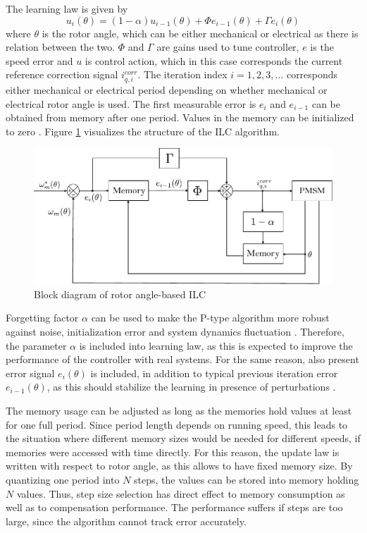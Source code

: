 The learning law is given by \cite{ILC:2005, ILC:2004}
\begin{equation}
    u_{i}(\theta) = (1 - \alpha)u_{i-1}(\theta) + \Phi e_{i-1}(\theta) + \Gamma e_{i}(\theta)
    \label{ILC_update_law2}
\end{equation}
where $\theta$ is the rotor angle, which can be either mechanical or electrical as there is relation between the two. $\Phi$ and $\Gamma$ are gains used to tune controller, $e$ is the speed error and $u$ is control action, which in this case corresponds the current reference correction signal $i^{corr}_{q,i}$. The iteration index $i = 1,2,3,...$ corresponds either mechanical or electrical period depending on whether mechanical or electrical rotor angle is used. The first measurable error is $e_i$ and $e_{i-1}$ can be obtained from memory after one period. Values in the memory can be initialized to zero \cite{ILC:2004}. Figure \ref{fig:ILC_angle_block} visualizes the structure of the ILC algorithm.
\begin{figure}[b]
    \centering
    \includegraphics[width=1.0\linewidth]{images/Angle_based_ILC.pdf} 
    \caption{Block diagram of rotor angle-based ILC}
    \label{fig:ILC_angle_block}
\end{figure}

Forgetting factor $\alpha$ can be used to make the P-type algorithm more robust against noise, initialization error and system dynamics fluctuation \cite{ILC:1990, ILC:2005}. Therefore, the parameter $\alpha$ is included into learning law, as this is expected to improve the performance of the controller with real systems. For the same reason, also present error signal $e_{i}(\theta)$ is included, in addition to typical previous iteration error $e_{i-1}(\theta)$, as this should stabilize the learning in presence of perturbations \cite{ILC:2004}.

The memory usage can be adjusted as long as the memories hold values at least for one full period. Since period length depends on running speed, this leads to the situation where different memory sizes would be needed for different speeds, if memories were accessed with time directly. For this reason, the update law is written with respect to rotor angle, as this allows to have fixed memory size. By quantizing one period into $N$ steps, the values can be stored into memory holding $N$ values. Thus, step size selection has direct effect to memory consumption as well as to compensation performance. The performance suffers if steps are too large, since the algorithm cannot track error accurately.

